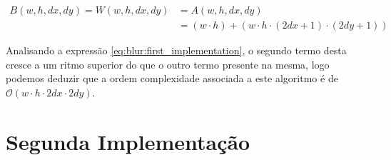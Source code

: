 \begin{align*}
	B(w, h, dx, dy) = W(w, h, dx, dy) & = A(w, h, dx, dy)                                           \\
	                                  & = (w \cdot h) + (w \cdot h \cdot (2dx + 1) \cdot (2dy + 1))
\end{align*}

Analisando a expressão \eqref{eq:blur:first_implementation}, o segundo termo
desta cresce a um ritmo superior do que o outro termo presente na mesma, logo
podemos deduzir que a ordem complexidade associada a este algoritmo é de
$\mathcal{O}(w \cdot h \cdot 2dx \cdot 2dy)$.




\section{Segunda Implementação}
